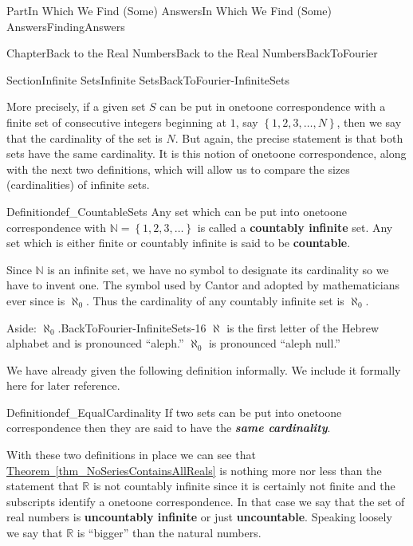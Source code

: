 \documentclass[oneside,10pt,]{book}
\newcommand{\xreffont}{\relax}
\newcommand{\alert}[1]{\textbf{\textit{#1}}}
\newcommand{\terminology}[1]{\textbf{#1}}
\numberwithin{equation}{part}
\newcommand{\RR}{\mathbb {R}}
\newcommand{\NN}{\mathbb {N}}
\begin{document}
\begin{partptx}{Part}{In Which We Find (Some) Answers}{}{In Which We Find (Some) Answers}{}{}{FindingAnswers}
\begin{chapterptx}{Chapter}{Back to the Real Numbers}{}{Back to the Real Numbers}{}{}{BackToFourier}
\begin{sectionptx}{Section}{Infinite Sets}{}{Infinite Sets}{}{}{BackToFourier-InfiniteSets}
\par
More precisely, if a given set \(S\) can be put in one\textendash{}to\textendash{}one correspondence with a finite set of consecutive integers beginning at \(1\), say \(\left\{1,2,3,\ldots, N\right\}\), then we say that the cardinality of the set is \(N\).  But again, the precise statement is  that both sets have the same cardinality.  It is this notion of one\textendash{}to\textendash{}one correspondence, along with the next two definitions, which will allow us to compare the sizes (cardinalities) of infinite sets.%
\begin{definition}{Definition}{}{def_CountableSets}%
%
%
%
%
Any set which can be put into one\textendash{}to\textendash{}one correspondence with \(\NN=\left\{1,2,3,\ldots\right\}\) is called a \terminology{countably infinite} set.  Any set which is either finite or countably infinite is said to be \terminology{countable}.%
\end{definition}
 Since \(\NN\) is an infinite set, we have no symbol to designate its cardinality so we have to invent one.  The symbol used by Cantor and adopted by mathematicians ever since is \(\aleph_0\).  Thus the cardinality of any countably infinite set is \(\aleph_0\).%
\begin{aside}{Aside}{: \(\boldsymbol\aleph_0\).}{BackToFourier-InfiniteSets-16}%
\(\aleph{}\) is the first letter of the Hebrew alphabet and is pronounced ``aleph.'' \(\aleph_0\) is pronounced ``aleph null.''%
\end{aside}
We have already given the following definition informally.  We include it formally here for later reference.%
\begin{definition}{Definition}{}{def_EqualCardinality}%
%
%
If two sets can be put into one\textendash{}to\textendash{}one correspondence then they are said to have the \alert{same cardinality}.%
\end{definition}
 With these two definitions in place we can see that \hyperref[thm_NoSeriesContainsAllReals]{Theorem~{\xreffont\ref{thm_NoSeriesContainsAllReals}}} is nothing more nor less than the statement that \(\RR{}\) is not countably infinite since it is certainly not finite and the subscripts identify a one\textendash{}to\textendash{}one correspondence. In that case we say that the set of real numbers is \terminology{uncountably infinite} or just \terminology{uncountable}. Speaking loosely we say that \(\RR \) is ``bigger'' than the natural numbers.%

\end{sectionptx}
\end{chapterptx}
\end{partptx}
\end{document}
